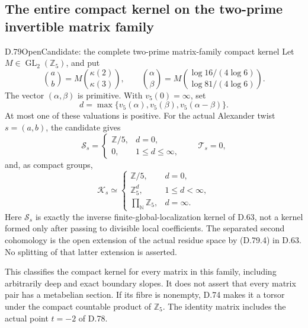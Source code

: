 \subsection{The entire compact kernel on the two-prime invertible matrix family}

\begin{statement}{D.79}{Open}{Candidate: the complete two-prime matrix-family compact kernel}
Let \(M\in\operatorname{GL}_2(\mathbb Z_5)\), and put
\[
 \binom ab=M\binom{\kappa(2)}{\kappa(3)},\qquad
 \binom\alpha\beta
 =M\binom{\log16/(4\log6)}{\log81/(4\log6)}.
                                                               \tag{D.79.1}
\]
The vector \((\alpha,\beta)\) is primitive. With
\(v_5(0)=\infty\), set
\[
 d=\max\{v_5(\alpha),v_5(\beta),v_5(\alpha-\beta)\}.
                                                               \tag{D.79.2}
\]
At most one of these valuations is positive. For the actual
Alexander twist \(s=(a,b)\), the candidate gives
\[
 \mathcal S_s=
 \begin{cases}
  \mathbb Z/5,&d=0,\\
  0,&1\le d\le\infty,
 \end{cases}
 \qquad \mathcal T_s=0,
                                                               \tag{D.79.3}
\]
and, as compact groups,
\[
 \mathcal K_s\simeq
 \begin{cases}
  \mathbb Z/5,&d=0,\\
  \mathbb Z_5^d,&1\le d<\infty,\\
  \displaystyle\prod_{\mathbb N}\mathbb Z_5,&d=\infty.
 \end{cases}                                                   \tag{D.79.4}
\]
Here \(\mathcal S_s\) is exactly the inverse finite-global-localization
kernel of D.63, not a kernel formed only after passing to divisible
local coefficients. The separated second cohomology is the open
extension of the actual residue space by (D.79.4) in D.63.
No splitting of that latter extension is asserted.

This classifies the compact kernel for every matrix in this family,
including arbitrarily deep and exact boundary slopes. It does not
assert that every matrix pair has a metabelian section. If its fibre
is nonempty, D.74 makes it a torsor under the compact countable
product of \(\mathbb Z_5\). The identity matrix includes the actual
point \(t=-2\) of D.78.
\end{statement}

